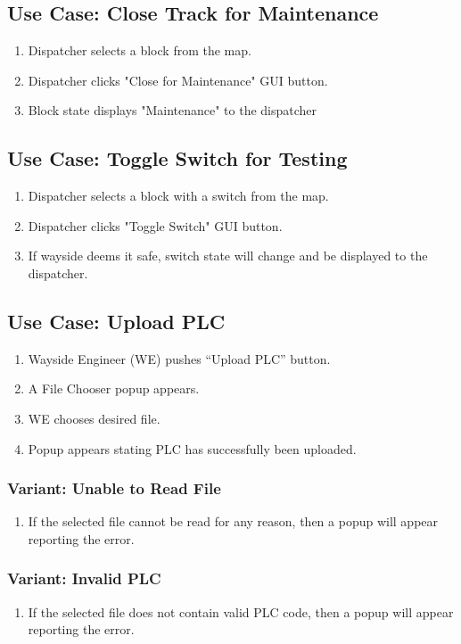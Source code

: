 \documentclass{scrreprt}
\begin{document}
\subsection{Use Case: Close Track for Maintenance}
\begin{enumerate}
	\item Dispatcher selects a block from the map.
	\item Dispatcher clicks "Close for Maintenance" GUI button.
	\item Block state displays "Maintenance" to the dispatcher
\end{enumerate}

\subsection{Use Case: Toggle Switch for Testing}
\begin{enumerate}
	\item Dispatcher selects a block with a switch from the map.
	\item Dispatcher clicks "Toggle Switch" GUI button.
	\item If wayside deems it safe, switch state will change and be displayed to the dispatcher.
\end{enumerate}

\subsection{Use Case: Upload PLC}
\begin{enumerate}
    \item Wayside Engineer (WE) pushes ``Upload PLC'' button.
    \item A File Chooser popup appears.
    \item WE chooses desired file.
    \item Popup appears stating PLC has successfully been uploaded.
\end{enumerate}
\subsubsection{Variant: Unable to Read File}
\begin{enumerate}[label = \arabic*a., start = 4]
    \item If the selected file cannot be read for any reason, then a popup will appear reporting the error.
\end{enumerate}
\subsubsection{Variant: Invalid PLC}
\begin{enumerate}[label = \arabic*b., start = 4]
    \item If the selected file does not contain valid PLC code, then a popup will appear reporting the error.
\end{enumerate}
\end{document}

